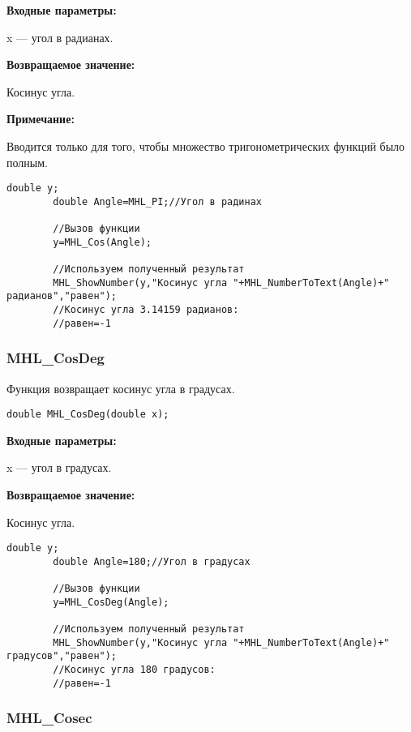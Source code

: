 \documentclass[a4paper,12pt]{article}
\begin{document}
\textbf{Входные параметры:}

 x --- угол в радианах.

\textbf{Возвращаемое значение:}

Косинус угла.

\textbf{Примечание:}

Вводится только для того, чтобы множество тригонометрических функций было полным.


\begin{lstlisting}[label=code_use_MHL_Cos,caption=Пример использования]
        double y;
        double Angle=MHL_PI;//Угол в радинах

        //Вызов функции
        y=MHL_Cos(Angle);

        //Используем полученный результат
        MHL_ShowNumber(y,"Косинус угла "+MHL_NumberToText(Angle)+" радианов","равен");
        //Косинус угла 3.14159 радианов:
        //равен=-1
\end{lstlisting}

\subsubsection{MHL\_CosDeg}\label{MHL_CosDeg}

Функция возвращает косинус угла в градусах.


\begin{lstlisting}[label=code_syntax_MHL_CosDeg,caption=Синтаксис]
double MHL_CosDeg(double x);
\end{lstlisting}

\textbf{Входные параметры:}

 x --- угол в градусах.

\textbf{Возвращаемое значение:}

Косинус угла.


\begin{lstlisting}[label=code_use_MHL_CosDeg,caption=Пример использования]
        double y;
        double Angle=180;//Угол в градусах

        //Вызов функции
        y=MHL_CosDeg(Angle);

        //Используем полученный результат
        MHL_ShowNumber(y,"Косинус угла "+MHL_NumberToText(Angle)+" градусов","равен");
        //Косинус угла 180 градусов:
        //равен=-1
\end{lstlisting}

\subsubsection{MHL\_Cosec}\label{MHL_Cosec}
\end{document}

